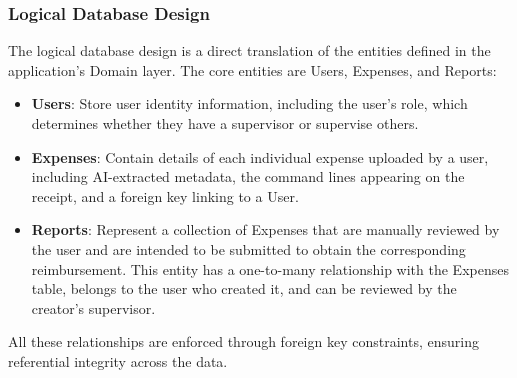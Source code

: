 \subsubsection{Logical Database Design}

The logical database design is a direct translation of the entities defined in the application’s Domain layer. The core entities are Users, Expenses, and Reports:

\begin{itemize} [leftmargin=0.75cm, noitemsep, label=$\bullet$]

    \item \textbf{Users}: Store user identity information, including the user’s role, which determines whether they have a supervisor or supervise others.

    \item \textbf{Expenses}: Contain details of each individual expense uploaded by a user, including AI-extracted metadata, the command lines appearing on the receipt, and a foreign key linking to a User.

    \item \textbf{Reports}: Represent a collection of Expenses that are manually reviewed by the user and are intended to be submitted to obtain the corresponding reimbursement. This entity has a one-to-many relationship with the Expenses table, belongs to the user who created it, and can be reviewed by the creator’s supervisor.

\end{itemize}

All these relationships are enforced through foreign key constraints, ensuring referential integrity across the data.

